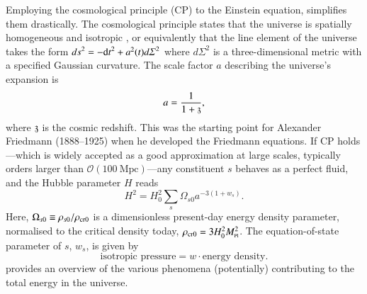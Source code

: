 




\newcommand*\pert{\ALIASpert}







Employing the cosmological principle (CP) to the Einstein equation, simplifies them drastically. The cosmological principle states that the universe is spatially homogeneous and isotropic%
, %
or equivalently that the line element of the universe takes the form 
${ds}^2 = -{\diff t}^2 + a^2(t){d\varSigma}^2$ where ${d\varSigma}^2$
is a three-dimensional metric with a specified Gaussian curvature. The scale factor $a$ describing the universe's expansion is %
\begin{equation}
    a = \frac{1}{1+\mathfrak{z}},
\end{equation}
where $\mathfrak{z}$ is the cosmic redshift. %
This was the starting point for Alexander Friedmann (1888--1925) when he developed the Friedmann equations. If CP holds---which is widely accepted as a good approximation at large scales, typically orders larger than $\mathscr{O}(100~\mathrm{Mpc})$---any constituent $s$ behaves as a perfect fluid, and the Hubble parameter $H$ reads %
\begin{equation}\label{eq:GR:lcdm:first_Friedmann}
    H^2 = H_0^2 \sum_s \Omega_{s0} a^{-3(1+w_s)}.
\end{equation}
Here, $\Omega_{s0}\equiv \rho_{s0}/\rho_\mathrm{cr0}$ is a dimensionless present-day energy density parameter, normalised to the critical density today, $\rho_\mathrm{cr0}= 3H_0^2 M_{\text{\tiny{Pl}}}^2$. %
The equation-of-state parameter of $s$, $w_s$, is given by
\[\text{isotropic pressure} = w \cdot \text{energy density}.\] %
 provides an overview of the various phenomena (potentially) contributing to the total energy in the universe.

